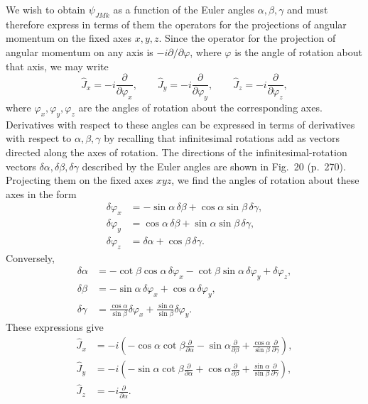 \SolutionHeading We wish to obtain $\psi_{JMk}$ as a function of the Euler angles $\alpha,\beta,\gamma$ and must therefore express in terms of them the operators for the projections of angular momentum on the fixed axes $x,y,z$. Since the operator for the projection of angular momentum on any axis is $-i\partial/\partial\varphi$, where $\varphi$ is the angle of rotation about that axis, we may write
\[
 \hat J_x=-i\frac{\partial}{\partial\varphi_x},\qquad
 \hat J_y=-i\frac{\partial}{\partial\varphi_y},\qquad
 \hat J_z=-i\frac{\partial}{\partial\varphi_z},
\]
where $\varphi_x,\varphi_y,\varphi_z$ are the angles of rotation about the corresponding axes. Derivatives with respect to these angles can be expressed in terms of derivatives with respect to $\alpha,\beta,\gamma$ by recalling that infinitesimal rotations add as vectors directed along the axes of rotation. The directions of the infinitesimal-rotation vectors $\delta\alpha,\delta\beta,\delta\gamma$ described by the Euler angles are shown in Fig.~20 (p.~270). Projecting them on the fixed axes $xyz$, we find the angles of rotation about these axes in the form
\[
\begin{aligned}
 \delta\varphi_x&=-\sin\alpha\,\delta\beta+\cos\alpha\sin\beta\,\delta\gamma,\\
 \delta\varphi_y&= \cos\alpha\,\delta\beta+\sin\alpha\sin\beta\,\delta\gamma,\\
 \delta\varphi_z&=\delta\alpha+\cos\beta\,\delta\gamma.
\end{aligned}
\]
Conversely,
\[
\begin{aligned}
 \delta\alpha&=-\cot\beta\cos\alpha\,\delta\varphi_x-\cot\beta\sin\alpha\,\delta\varphi_y+\delta\varphi_z,\\
 \delta\beta&=-\sin\alpha\,\delta\varphi_x+\cos\alpha\,\delta\varphi_y,\\
 \delta\gamma&=\frac{\cos\alpha}{\sin\beta}\delta\varphi_x+\frac{\sin\alpha}{\sin\beta}\delta\varphi_y.
\end{aligned}
\]
These expressions give
\[
\begin{aligned}
 \hat J_x&=-i\left(-\cos\alpha\cot\beta\frac{\partial}{\partial\alpha}-\sin\alpha\frac{\partial}{\partial\beta}+\frac{\cos\alpha}{\sin\beta}\frac{\partial}{\partial\gamma}\right),\\
 \hat J_y&=-i\left(-\sin\alpha\cot\beta\frac{\partial}{\partial\alpha}+\cos\alpha\frac{\partial}{\partial\beta}+\frac{\sin\alpha}{\sin\beta}\frac{\partial}{\partial\gamma}\right),\\
 \hat J_z&=-i\frac{\partial}{\partial\alpha}.
\end{aligned}
\]

